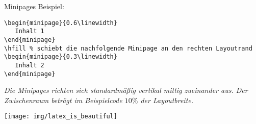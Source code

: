 \begin{frame}[fragile]{Minipages}
Beispiel:
\begin{lstlisting}[style=tex]
\begin{minipage}{0.6\linewidth}
   Inhalt 1
\end{minipage}
\hfill % schiebt die nachfolgende Minipage an den rechten Layoutrand
\begin{minipage}{0.3\linewidth}
   Inhalt 2
\end{minipage}
\end{lstlisting}

\begin{minipage}{0.7\linewidth}
\itshape Die Minipages richten sich standardmä{\ss}ig vertikal mittig zueinander aus. Der Zwischenraum beträgt im Beispielcode $10\%$ der Layoutbreite.
\end{minipage}
\hfill 
\begin{minipage}{0.25\linewidth}
   \texttt{[image: img/latex\_is\_beautiful]}
\end{minipage}
\end{frame}